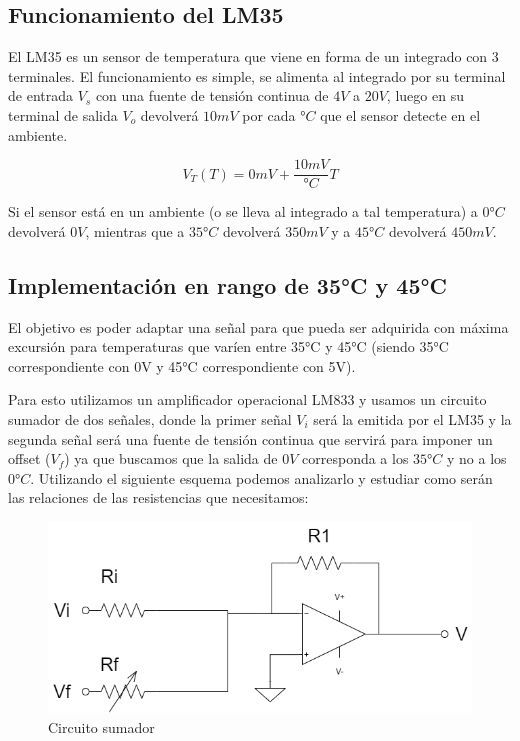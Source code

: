 \subsection{Funcionamiento del LM35}
El LM35 es un sensor de temperatura que viene en forma de un integrado con 3 terminales. El funcionamiento es simple, se alimenta al integrado por su terminal de entrada $V_s$ con una fuente de tensión continua de $4V$ a $20V$, luego en su terminal de salida $V_o$ devolverá $10mV$ por cada $°C$ que el sensor detecte en el ambiente.

\begin{equation}
    V_T(T) = 0mV + \frac{10 mV}{°C} T
\end{equation}


Si el sensor está en un ambiente (o se lleva al integrado a tal temperatura) a $0°C$ devolverá $0V$, mientras que a $35°C$ devolverá $350mV$ y a $45°C$ devolverá $450mV$.



\subsection{Implementación en rango de 35°C y 45°C}

El objetivo es poder adaptar una señal para que pueda ser adquirida con máxima excursión para temperaturas que varíen entre 35°C y 45°C (siendo 35°C correspondiente con 0V y 45°C correspondiente con 5V).

Para esto utilizamos un amplificador operacional LM833 y usamos un circuito sumador de dos señales, donde la primer señal $V_i$ será la emitida por el LM35 y la segunda señal será una fuente de tensión continua que servirá para imponer un offset ($V_f$) ya que buscamos que la salida de $0V$ corresponda a los $35°C$ y no a los $0°C$. Utilizando el siguiente esquema podemos analizarlo y estudiar como serán las relaciones de las resistencias que necesitamos:

\begin{figure}[H]
    \centering
    \includegraphics[scale=0.5]{../Ejercicio4-CircuitodeAplicacion/SumLM35.png}
    \caption{Circuito sumador}
\end{figure}

